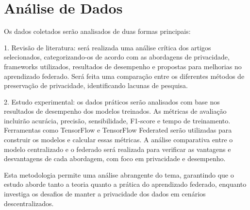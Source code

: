 \section{Análise de Dados}

Os dados coletados serão analisados de duas formas principais:

1. Revisão de literatura: será realizada uma análise crítica dos artigos selecionados, categorizando-os de acordo com as abordagens de privacidade, frameworks utilizados, resultados de desempenho e propostas para melhorias no aprendizado federado. Será feita uma comparação entre os diferentes métodos de preservação de privacidade, identificando lacunas de pesquisa.

2. Estudo experimental: os dados práticos serão analisados com base nos resultados de desempenho dos modelos treinados. As métricas de avaliação incluirão acurácia, precisão, sensibilidade, F1-score e tempo de treinamento. Ferramentas como TensorFlow e TensorFlow Federated serão utilizadas para construir os modelos e calcular essas métricas. A análise comparativa entre o modelo centralizado e o federado será realizada para verificar as vantagens e desvantagens de cada abordagem, com foco em privacidade e desempenho.

Esta metodologia permite uma análise abrangente do tema, garantindo que o estudo aborde tanto a teoria quanto a prática do aprendizado federado, enquanto investiga os desafios de manter a privacidade dos dados em cenários descentralizados.